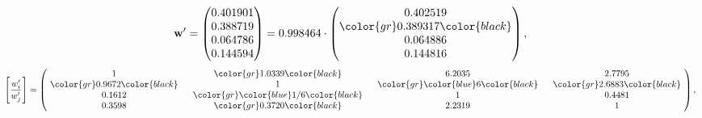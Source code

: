 \begin{example}
\begin{equation*}
\mathbf{w}^{\prime} =
\begin{pmatrix}
0.401901\\
0.388719\\
0.064786\\
0.144594
\end{pmatrix} =
0.998464\cdot
\begin{pmatrix}
0.402519\\
\color{gr} 0.389317\color{black} \\
0.064886\\
0.144816
\end{pmatrix},
\end{equation*}
\begin{equation*}
\left[ \frac{{w}^{\prime}_i}{{w}^{\prime}_j} \right] =
\begin{pmatrix}
$\,\,$ 1 $\,\,$ & $\,\,$\color{gr} 1.0339\color{black} $\,\,$ & $\,\,$6.2035$\,\,$ & $\,\,$2.7795$\,\,$ \\
$\,\,$\color{gr} 0.9672\color{black} $\,\,$ & $\,\,$ 1 $\,\,$ & $\,\,$\color{gr} \color{blue} 6\color{black} $\,\,$ & $\,\,$\color{gr} 2.6883\color{black}   $\,\,$ \\
$\,\,$0.1612$\,\,$ & $\,\,$\color{gr} \color{blue}  1/6\color{black} $\,\,$ & $\,\,$ 1 $\,\,$ & $\,\,$0.4481 $\,\,$ \\
$\,\,$0.3598$\,\,$ & $\,\,$\color{gr} 0.3720\color{black} $\,\,$ & $\,\,$2.2319$\,\,$ & $\,\,$ 1  $\,\,$ \\
\end{pmatrix},
\end{equation*}
\end{example}
\newpage
